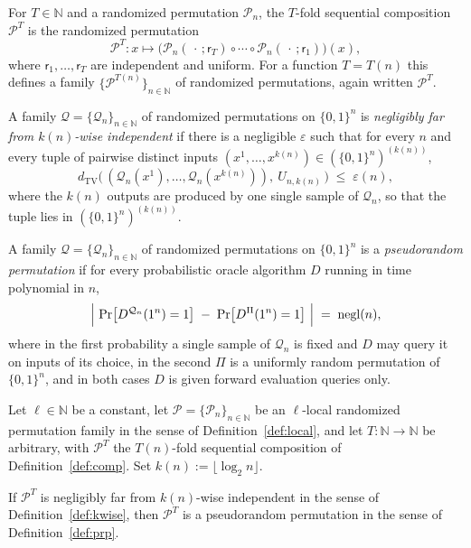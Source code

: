 \documentclass{aicr-conjecture}
\newcommand{\bits}{\{0,1\}}
\newcommand{\NN}{\mathbb{N}}
\newcommand{\cP}{\mathcal{P}}
\newcommand{\cQ}{\mathcal{Q}}
\newcommand{\negl}{\mathrm{negl}}
\newcommand{\dTV}{d_{\mathrm{TV}}}
\newcommand{\rnd}{\mathsf{r}}
\begin{document}
\begin{definition}\label{def:comp}
For $T \in \NN$ and a randomized permutation $\cP_n$, the $T$-fold
sequential composition $\cP^{T}$ is the randomized permutation
\[
  \cP^{T} \colon x \mapsto
  \bigl(\cP_n(\,\cdot\,;\rnd_T) \circ \cdots \circ
  \cP_n(\,\cdot\,;\rnd_1)\bigr)(x),
\]
where $\rnd_1,\dots,\rnd_T$ are independent and uniform. For a function
$T = T(n)$ this defines a family $\{\cP^{T(n)}\}_{n \in \NN}$ of
randomized permutations, again written $\cP^{T}$.
\end{definition}

\begin{definition}
\label{def:kwise}
A family $\cQ = \{\cQ_n\}_{n \in \NN}$ of randomized permutations on
$\bits^n$ is \emph{negligibly far from $k(n)$-wise independent} if there
is a negligible $\varepsilon$ such that for every $n$ and every tuple of
pairwise distinct inputs
$(x^1,\dots,x^{k(n)}) \in (\bits^n)^{(k(n))}$,
\[
  \dTV\bigl(\,(\cQ_n(x^1),\dots,\cQ_n(x^{k(n)})),\ U_{n,k(n)}\,\bigr)
  \;\le\; \varepsilon(n),
\]
where the $k(n)$ outputs are produced by one single sample of $\cQ_n$,
so that the tuple lies in $(\bits^n)^{(k(n))}$.
\end{definition}

\begin{definition}\label{def:prp}
A family $\cQ = \{\cQ_n\}_{n \in \NN}$ of randomized permutations on
$\bits^n$ is a \emph{pseudorandom permutation} if for every
probabilistic oracle algorithm $D$ running in time polynomial in $n$,
\[
  \Bigl|\ \Pr\bigl[D^{\cQ_n}(1^n) = 1\bigr] \;-\;
  \Pr\bigl[D^{\Pi}(1^n) = 1\bigr]\ \Bigr| \;=\; \negl(n),
\]
where in the first probability a single sample of $\cQ_n$ is fixed and
$D$ may query it on inputs of its choice, in the second $\Pi$ is a
uniformly random permutation of $\bits^n$, and in both cases $D$ is
given forward evaluation queries only.
\end{definition}

\begin{conjecture}\label{conj:main}
Let $\ell \in \NN$ be a constant, let $\cP = \{\cP_n\}_{n \in \NN}$ be
an $\ell$-local randomized permutation family in the sense of
Definition~\ref{def:local}, and let $T \colon \NN \to \NN$ be arbitrary,
with $\cP^{T}$ the $T(n)$-fold sequential composition of
Definition~\ref{def:comp}. Set $k(n) := \lfloor \log_2 n \rfloor$.

If $\cP^{T}$ is negligibly far from $k(n)$-wise independent in the sense
of Definition~\ref{def:kwise}, then $\cP^{T}$ is a pseudorandom
permutation in the sense of Definition~\ref{def:prp}.
\end{conjecture}
\end{document}
